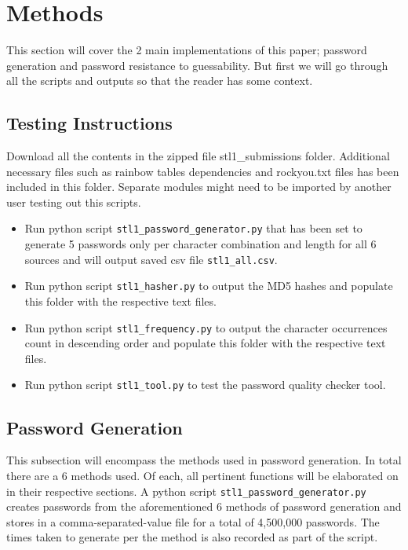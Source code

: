 \documentclass[letterpaper,twocolumn,10pt]{article}
\begin{document}
\section{Methods}
This section will cover the 2 main implementations of this paper; password generation and password resistance to guessability. But first we will go through all the scripts and outputs so that the reader has some context.

\subsection{Testing Instructions}
Download all the contents in the zipped file stl1\_submissions folder. Additional necessary files such as rainbow tables dependencies and rockyou.txt files has been included in this folder. Separate modules might need to be imported by another user testing out this scripts.

\begin{itemize}
  \item Run python script \lstinline{stl1_password_generator.py} that has been set to generate 5 passwords only per character combination and length for all 6 sources and will output saved csv file \lstinline{stl1_all.csv}.
  \item Run python script \lstinline{stl1_hasher.py} to output the MD5 hashes and populate this folder with the respective text files.
  \item Run python script \lstinline{stl1_frequency.py} to output the character occurrences count in descending order and populate this folder with the respective text files.
  \item Run python script \lstinline{stl1_tool.py} to test the password quality checker tool.
\end{itemize}

\subsection{Password Generation}
This subsection will encompass the methods used in password generation. In total there are a 6 methods used. Of each, all pertinent functions will be elaborated on in their respective sections. A python script \lstinline{stl1_password_generator.py} creates passwords from the aforementioned 6 methods of password generation and stores in a comma-separated-value file for a total of 4,500,000 passwords. The times taken to generate per the method is also recorded as part of the script.
\end{document}

